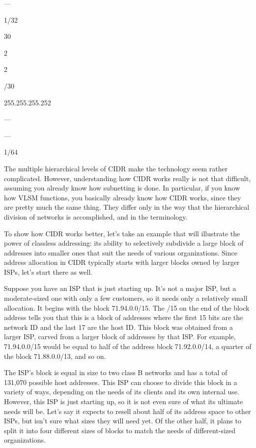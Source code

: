 ---

1/32

30

2

2

/30

255.255.255.252

---

---

1/64

\protect\hypertarget{ch20s04.html}{}{}

The multiple hierarchical levels of CIDR make the technology seem rather
complicated. However, understanding how CIDR works really is not that
difficult, assuming you already know how subnetting is done. In
particular, if you know how VLSM functions, you basically already know
how CIDR works, since they are pretty much the same thing. They differ
only in the way that the hierarchical division of networks is
accomplished, and in the terminology.

To show how CIDR works better, let's take an example that will
illustrate the power of classless
\protect\hypertarget{ch20s04.htmlux5cux23idx-CHP-20-0772}{}{}addressing:
its ability to selectively subdivide a large block of addresses into
smaller ones that suit the needs of various organizations. Since address
allocation in CIDR typically starts with larger blocks owned by larger
ISPs, let's start there as well.

Suppose you have an ISP that is just starting up. It's not a major ISP,
but a moderate-sized one with only a few customers, so it needs only a
relatively small allocation. It begins with the block 71.94.0.0/15. The
/15 on the end of the block address tells you that this is a block of
addresses where the first 15 bits are the network ID and the last 17 are
the host ID. This block was obtained from a larger ISP, carved from a
larger block of addresses by that ISP. For example, 71.94.0.0/15 would
be equal to half of the address block 71.92.0.0/14, a quarter of the
block 71.88.0.0/13, and so on.

The ISP's block is equal in size to two class B networks and has a total
of 131,070 possible host addresses. This ISP can choose to divide this
block in a variety of ways, depending on the needs of its clients and
its own internal use. However, this ISP is just starting up, so it is
not even sure of what its ultimate needs will be. Let's say it expects
to resell about half of its address space to other ISPs, but isn't sure
what sizes they will need yet. Of the other half, it plans to split it
into four different sizes of blocks to match the needs of
different-sized organizations.

